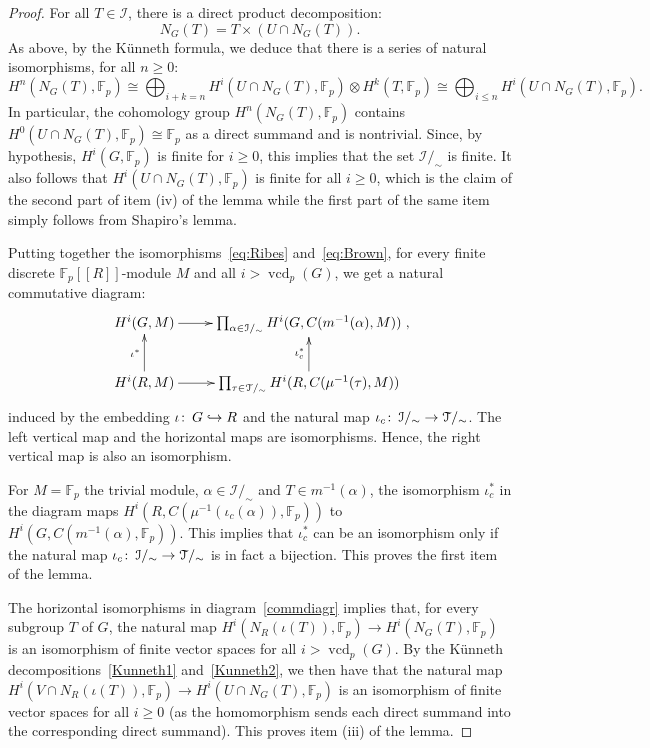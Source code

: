 \documentclass[12pt,twoside]{amsart}
\newcommand\F{{\mathbb F}}
\newcommand\hookra{\hookrightarrow}
\newcommand\cT{{\mathcal T}}
\newcommand\cI{{\mathcal I}}
\def\co{\colon\thinspace}
\newcommand\vcd{\operatorname{vcd}}
\theoremstyle{definition}
\begin{document}
\begin{proof}
 For all $T\in \cI$, there is a direct product decomposition: 
\[N_G(T)=T\times(U\cap N_G(T)).\]
As above, by the K\"unneth formula, we deduce that there is a series of natural isomorphisms, for all $n\geq 0$:
\begin{equation}\label{Kunneth2}
H^n(N_G(T),\F_p)\cong\bigoplus_{i+k=n} H^i(U\cap N_G(T),\F_p)\otimes H^k(T,\F_p)\cong\bigoplus_{i\leq n} H^i(U\cap N_G(T),\F_p).
\end{equation}
In particular, the cohomology group $H^n(N_G(T),\F_p)$ contains $H^0(U\cap N_G(T),\F_p)\cong\F_p$ as a direct summand and is nontrivial.
Since, by hypothesis, $H^i(G, \F_p)$ is finite for $i\geq 0$, this implies that the set $\cI/_\sim$ is finite. It also follows that $H^i(U\cap N_G(T),\F_p)$
is finite for all $i\geq 0$, which is the claim of the second part of item (iv) of the lemma while
the first part of the same item simply follows from Shapiro's lemma. 

\smallskip
Putting together the isomorphisms~\eqref{eq:Ribes} and~\eqref{eq:Brown}, for every finite discrete $\F_p[[R]]$-module $M$ and all 
$i>\vcd_p(G)$, we get a natural commutative diagram:
\begin{equation}\label{commdiagr}
\xymatrix{H^i(G,M)\ar[r]& \prod_{\alpha \in \cI/_\sim} H^i(G,C(m^{-1}(\alpha),M)) \\	
H^i(R,M)\ar[u]^{\iota^\ast}	\ar[r]&\prod_{\tau\in\cT/_\sim} H^i(R,C(\mu^{-1}(\tau),M))\ar[u]^{\iota_c^\ast}	}, 
\end{equation}
induced by the embedding $\iota\co G\hookra R$ and the natural map $\iota_c\co \cI/_\sim\to\cT/_\sim$.
The left vertical map and the horizontal maps are isomorphisms. Hence, the right vertical map is also an isomorphism. 

For $M=\F_p$ the trivial module, $\alpha\in\cI/_\sim$ and $T\in m^{-1}(\alpha)$, the isomorphism $\iota_c^\ast$ in the diagram maps
$H^i(R,C(\mu^{-1}(\iota_c(\alpha)),\F_p))$ to $H^i(G,C(m^{-1}(\alpha),\F_p))$. This implies that $\iota_c^\ast$ can be an isomorphism 
only if the natural map $\iota_c\co \cI/_\sim\to\cT/_\sim$ is in fact a bijection. This proves the first item of the lemma. 

The horizontal isomorphisms in diagram~\eqref{commdiagr} implies that, for every subgroup $T$ of $G$, 
the natural map $H^i(N_R(\iota(T)), \F_p) \to H^i(N_G(T), \F_p)$ is an isomorphism of finite vector spaces for all $i>\vcd_p(G)$. 
By the K\"unneth decompositions~\eqref{Kunneth1} and~\eqref{Kunneth2}, we then have that the natural map
$H^i (V\cap N_{R}(\iota(T)),\F_p)\to H^i(U\cap N_G(T),\F_p)$ is an isomorphism of finite vector spaces for all $i\geq 0$ 
(as the homomorphism sends each direct summand into the corresponding direct summand). This proves item (iii) of the lemma.
\end{proof}
\end{document}
